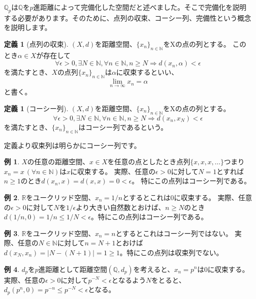 \documentclass[uplatex]{jsarticle}
\newcommand{\Q}{\mathbb{Q}}
\newcommand{\R}{\mathbb{R}}
\theoremstyle{definition} %
\newtheorem{defi}[thm]{定義}
\newtheorem*{example*}{例}
\begin{document}
$\Q_p$は$\Q$を$p$進距離によって完備化した空間だと述べました。そこで完備化を説明する必要があります。そのために、点列の収束、コーシー列、完備性という概念を説明します。

\begin{oframed}\begin{defi}[点列の収束]
$(X, d)$を距離空間、$\{x_n\}_{n\in\mathbb{N}}$をXの点の列とする。
このとき$\alpha \in X$が存在して
\[
\forall \epsilon>0, \exists N\in\mathbb{N}, \forall n \in \mathbb{N}, n \geq N \Rightarrow d(x_n, \alpha) < \epsilon
\]
を満たすとき、$X$の点列$\{x_n\}_{n\in\mathbb{N}}$は$\alpha$に収束するといい、
\[
\lim_{n \to \infty} x_n = \alpha
\]
と書く。
\end{defi}\end{oframed}

\begin{oframed}\begin{defi}[コーシー列]
$(X, d)$を距離空間、$\{x_n\}_{n\in\mathbb{N}}$をXの点の列とする。
\[
\forall \epsilon>0, \exists N\in\mathbb{N}, \forall n \in \mathbb{N}, n \geq N \Rightarrow d(x_n, x_N) < \epsilon
\]
を満たすとき、$\{x_n\}_{n\in\mathbb{N}}$はコーシー列であるという。
\end{defi}\end{oframed}

定義より収束列は明らかにコーシー列です。

\begin{example*}
$X$の任意の距離空間、$x \in X$を任意の点としたとき点列$\{x, x, x, \dots\}$つまり$x_n = x \,(\forall n \in \mathbb{N})$は$x$に収束する。
実際、任意の$\epsilon > 0$に対して$N = 1$とすれば$n \geq 1$のとき$d(x_n, x) = d(x, x) = 0 < \epsilon$。
特にこの点列はコーシー列である。
\end{example*}

\begin{example*}
$\R$をユークリッド空間、$x_n = 1/n$とするとこれは$0$に収束する。
実際、任意の$\epsilon > 0$に対して$N$を$1 / \epsilon$より大きい自然数とおけば、$n \geq N$のとき$d(1/n, 0) = 1/n \leq 1/N < \epsilon$。特にこの点列はコーシー列である。
\end{example*}

\begin{example*}
$\R$をユークリッド空間、$x_n = n$とするとこれはコーシー列ではない。
実際、任意の$N \in \mathbb{N}$に対して$n = N+1$とおけば$d(x_N, x_{n}) = |N - (N+1)| = 1 \geq 1$。特にこの点列は収束列でない。
\end{example*}

\begin{example*}
$d_p$を$p$進距離として距離空間$(\Q, d_p)$を考えると、$x_n = p^n$は$0$に収束する。
実際、任意の$\epsilon > 0$に対して$p^{-N} < \epsilon$となるよう$N$をとると、$d_p(p^n, 0) = p^{-n} \leq p^{-N} < \epsilon$となる。
\end{example*}
\end{document}
